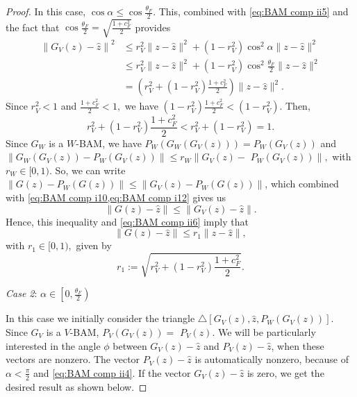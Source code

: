 \documentclass[smallextended,numbook,nospthms]{svjour3}
\theoremstyle{plain}
\theoremstyle{definition}
\begin{document}
\begin{proof}
	
	In this case, $\cos \alpha \leq \cos \frac{\theta_{F}}{2}$. This, combined with \cref{eq:BAM comp ii5} and the fact that $\cos \frac{\theta_{F}}{2}=\sqrt{\frac{1+c_{F}^{2}}{2}}$ provides
	\begin{align}
		\left\|G_{V}(z)-\hat{z}\right\|^{2} & \leq r_{V}^{2}\|z-\hat{z}\|^{2}+\left(1-r_{V}^{2}\right) \cos ^{2} \alpha\|z-\hat{z}\|^{2} \\
		& \leq r_{V}^{2}\|z-\hat{z}\|^{2}+\left(1-r_{V}^{2}\right) \cos ^{2} \frac{\theta_{F}}{2}\|z-\hat{z}\|^{2} \\
		&=\left(r_{V}^{2}+\left(1-r_{V}^{2}\right) \frac{1+c_{F}^{2}}{2}\right)\|z-\hat{z}\|^{2}. \label{eq:BAM comp ii6}
	\end{align}
	Since $r_{V}^{2}<1$ and $\frac{1+c_{F}^{2}}{2}<1,$ we have $\left(1-r_{V}^{2}\right) \frac{1+c_{F}^{2}}{2}<\left(1-r_{V}^{2}\right)$. Then,
	\begin{equation}
		r_{V}^{2}+\left(1-r_{V}^{2}\right) \frac{1+c_{F}^{2}}{2}<r_{V}^{2}+\left(1-r_{V}^{2}\right)=1. \label{eq:BAM comp ii7}
	\end{equation}
	Since $G_{W}$ is a $W$-BAM, we have $P_{W}\left(G_{W}\left(G_{V}(z)\right)\right)=P_{W}\left(G_{V}(z)\right)$ and $\left\|G_{W}\left(G_{V}(z)\right)-P_{W}\left(G_{V}(z)\right)\right\| \leq r_{W} \| G_{V}(z)-$
	$P_{W}\left(G_{V}(z)\right) \|,$ with $r_{W} \in[0,1)$. So, we can write $\left\|G(z)-P_{W}(G(z))\right\| \leq\left\|G_{V}(z)-P_{W}(G(z))\right\|$, which combined with \cref{eq:BAM comp i10,eq:BAM comp i12}
	gives us
	\begin{equation}
		\|G(z)-\hat{z}\| \leq\left\|G_{V}(z)-\hat{z}\right\| \label{eq:BAM comp ii8}.
	\end{equation}
	Hence, this inequality and \cref{eq:BAM comp ii6} imply that
	\begin{equation}
	\|G(z)-\hat{z}\| \leq r_{1}\|z-\hat{z}\|, \label{eq:BAM comp ii9}
	\end{equation}
	with $r_{1} \in[0,1),$ given by
	\begin{equation}
	r_{1}:=\sqrt{r_{V}^{2}+\left(1-r_{V}^{2}\right) \frac{1+c_{F}^{2}}{2}}. \label{eq:BAM comp ii10}
	\end{equation}

	\emph{Case 2}: $\alpha \in\left[0, \frac{\theta_{F}}{2}\right)$
	
	In this case we initially consider the triangle $\triangle[G_{V}(z), \hat{z},P_{W}\left(G_{V}(z)\right)]$. Since $G_{V}$ is a $V$-BAM, $P_{V}\left(G_{V}(z)\right)=$ $P_{V}(z)$. We will be particularly interested in the angle $\phi$ between $G_{V}(z)-\hat{z}$ and $P_{V}(z)-\hat{z}$, when these vectors are nonzero. The vector $P_{V}(z)-\hat{z}$ is automatically nonzero, because of $\alpha<\frac{\pi}{2}$ and \cref{eq:BAM comp ii4}. If the vector $G_{V}(z)-\hat{z}$ is zero, we get the desired result as shown below.
	

\end{proof}
\end{document}
